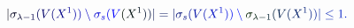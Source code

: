 \documentclass[12pt]{article}
\begin{document}
\makeatletter
\renewcommand*{\@textcolor}[3]{%
  \protect\leavevmode
  \begingroup
    \color#1{#2}#3%
  \endgroup
}
\makeatother
\begin{displaymath}
\mathcolor[RGB]{0,0,15}{|} \mathcolor[RGB]{0,0,30}{\sigma} _ { \mathcolor[RGB]{0,0,45}{\lambda} \mathcolor[RGB]{0,0,60}{-} \mathcolor[RGB]{0,0,75}{1} } \mathcolor[RGB]{0,0,90}{(} \mathcolor[RGB]{0,0,105}{V} \mathcolor[RGB]{0,0,120}{(} \mathcolor[RGB]{0,0,135}{X} ^ { \mathcolor[RGB]{0,0,150}{1} } \mathcolor[RGB]{0,0,165}{)} \mathcolor[RGB]{0,0,180}{)} \mathcolor[RGB]{0,0,195}{\setminus} \mathcolor[RGB]{0,0,210}{\sigma} _ { \mathcolor[RGB]{0,0,225}{s} } \mathcolor[RGB]{0,0,240}{(} \mathcolor[RGB]{0,0,255}{V} \mathcolor[RGB]{0,15,0}{(} \mathcolor[RGB]{0,15,15}{X} ^ { \mathcolor[RGB]{0,15,30}{1} } \mathcolor[RGB]{0,15,45}{)} \mathcolor[RGB]{0,15,60}{)} \mathcolor[RGB]{0,15,75}{|} \mathcolor[RGB]{0,15,90}{=} \mathcolor[RGB]{0,15,105}{|} \mathcolor[RGB]{0,15,120}{\sigma} _ { \mathcolor[RGB]{0,15,135}{s} } \mathcolor[RGB]{0,15,150}{(} \mathcolor[RGB]{0,15,165}{V} \mathcolor[RGB]{0,15,180}{(} \mathcolor[RGB]{0,15,195}{X} ^ { \mathcolor[RGB]{0,15,210}{1} } \mathcolor[RGB]{0,15,225}{)} \mathcolor[RGB]{0,15,240}{)} \mathcolor[RGB]{0,15,255}{\setminus} \mathcolor[RGB]{0,30,0}{\sigma} _ { \mathcolor[RGB]{0,30,15}{\lambda} \mathcolor[RGB]{0,30,30}{-} \mathcolor[RGB]{0,30,45}{1} } \mathcolor[RGB]{0,30,60}{(} \mathcolor[RGB]{0,30,75}{V} \mathcolor[RGB]{0,30,90}{(} \mathcolor[RGB]{0,30,105}{X} ^ { \mathcolor[RGB]{0,30,120}{1} } \mathcolor[RGB]{0,30,135}{)} \mathcolor[RGB]{0,30,150}{)} \mathcolor[RGB]{0,30,165}{|} \mathcolor[RGB]{0,30,180}{\leq} \mathcolor[RGB]{0,30,195}{1} \mathcolor[RGB]{0,30,210}{.}
\end{displaymath}
\end{document}
